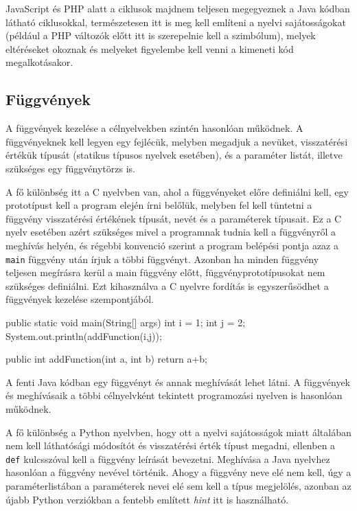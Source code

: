 JavaScript és PHP alatt a ciklusok majdnem teljesen megegyeznek a Java kódban látható ciklusokkal, természetesen itt is meg kell említeni a nyelvi sajátosságokat (például a PHP változók előtt itt is szerepelnie kell a \textdollar szimbólum), melyek eltéréseket okoznak és melyeket figyelembe kell venni a kimeneti kód megalkotásakor.

\subsection{Függvények}

A függvények kezelése a célnyelvekben szintén hasonlóan működnek. A függvényeknek kell legyen egy fejlécük, melyben megadjuk a nevüket, visszatérési értékük típusát (statikus típusos nyelvek esetében), és a paraméter listát, illetve szükséges egy függvénytörzs is.

A fő különbség itt a C nyelvben van, ahol a függvényeket előre definiálni kell, egy prototípust kell a program elején írni belőlük, melyben fel kell tüntetni a függvény visszatérési értékének típusát, nevét és a paraméterek típusait. Ez a C nyelv esetében azért szükséges mivel a programnak tudnia kell a függvényről a meghívás helyén, és régebbi konvenció szerint a program belépési pontja azaz a \texttt{main} függvény után írjuk a többi függvényt. Azonban ha minden függvény teljesen megírásra kerül a main függvény előtt, függvényprototípusokat nem szükséges definiálni. Ezt kihasználva a C nyelvre fordítás is egyszerűsödhet a függvények kezelése szempontjából.
\begin{cpp}
	public static void main(String[] args) {
		int i = 1;
		int j = 2;
		System.out.println(addFunction(i,j));
	}
	
	public int addFunction(int a, int b) {
		return a+b;
	}
\end{cpp}
A fenti Java kódban egy függvényt és annak meghívását lehet látni. A függvények és meghívásaik a többi célnyelvként tekintett programozási nyelven is hasonlóan működnek.

A fő különbség a Python nyelvben, hogy ott a nyelvi sajátosságok miatt általában nem kell láthatósági módosítót és visszatérési érték típust megadni, ellenben a \texttt{def} kulcsszóval kell a függvény leírását bevezetni. Meghívása a Java nyelvhez hasonlóan a függvény nevével történik. Ahogy a függvény neve elé nem kell, úgy a paraméterlistában a paraméterek nevei elé sem kell a típus megjelölés, azonban az újabb Python verziókban a fentebb említett \textit{hint} itt is használható.

